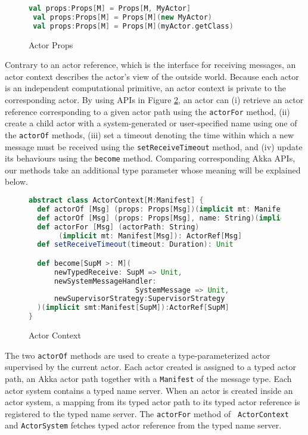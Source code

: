 \begin{figure}
\label{takka_props}
\begin{lstlisting}[language=scala]
 val props:Props[M] = Props[M, MyActor]
 val props:Props[M] = Props[M](new MyActor)
 val props:Props[M] = Props[M](myActor.getClass)
\end{lstlisting}
    \caption{Actor Props}
\end{figure}


Contrary to an actor reference, which is the interface for receiving messages, 
an actor context describes the actor's view of the outside world.   Because 
each actor is an independent computational 
primitive, an actor context is private to the corresponding actor.  By using 
APIs in Figure \ref{ActorContext}, an actor can (i) retrieve an actor reference 
corresponding to a given actor path using the {\tt actorFor} method, (ii) 
create a child actor with a system-generated or user-specified name using one 
of the {\tt actorOf} methods, (iii) set a timeout denoting the time within which
a new message must be received using the {\tt setReceiveTimeout} method, and
(iv) update its behaviours using the {\tt become} method.  Comparing 
corresponding Akka APIs, our methods take an additional type parameter whose 
meaning will be explained below.

\begin{figure}[h]
\label{ActorContext}
      \begin{lstlisting}[language=scala]
abstract class ActorContext[M:Manifest] {
  def actorOf [Msg] (props: Props[Msg])(implicit mt: Manifest[Msg]): ActorRef[Msg]
  def actorOf [Msg] (props: Props[Msg], name: String)(implicit mt: Manifest[Msg]): ActorRef[Msg]
  def actorFor [Msg] (actorPath: String)
       (implicit mt: Manifest[Msg]): ActorRef[Msg]
  def setReceiveTimeout(timeout: Duration): Unit

  def become[SupM >: M](
      newTypedReceive: SupM => Unit,
      newSystemMessageHandler:
                         SystemMessage => Unit,
      newSupervisorStrategy:SupervisorStrategy
  )(implicit smt:Manifest[SupM]):ActorRef[SupM]
}
    \end{lstlisting}
    \caption{Actor Context}
\end{figure}

The two {\tt actorOf} methods are used to create a type-parameterized actor supervised 
by the current actor.  Each actor created is assigned to a typed actor path, 
an Akka actor path together with a {\tt Manifest} of the message type.  Each 
actor system contains a typed name server.  When an actor is created inside an 
actor system, a mapping from its typed actor path to its typed actor reference 
is registered to the typed name server.  The {\tt actorFor} method of {\tt 
ActorContext} and {\tt ActorSystem} fetches typed actor reference from the 
typed name server.


